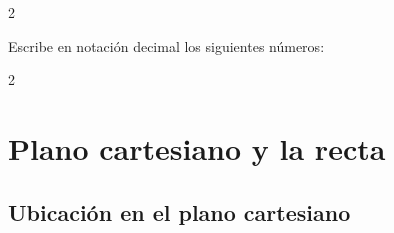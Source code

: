 \documentclass[12pt,examen,answers]{repaso_layout}
\begin{document}
\begin{questions}
\begin{multicols}{2}
            \end{multicols}
     
      \question[4] Escribe en notación decimal los siguientes números:
   
      \begin{multicols}{2}
      \end{multicols}

      \newpage
	\section{Plano cartesiano y la recta}

      
	\subsection{Ubicación en el plano cartesiano}


\end{questions}
\end{document}
